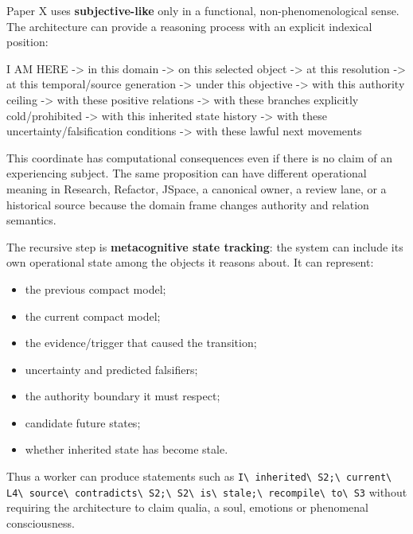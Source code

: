 \documentclass[
  10pt,
  letterpaper,
]{article}
\newenvironment{Shaded}{}{}
\newcommand{\NormalTok}[1]{#1}
\providecommand{\tightlist}{%
  \setlength{\itemsep}{0pt}\setlength{\parskip}{0pt}}
\begin{document}
Paper X uses \textbf{subjective-like} only in a functional,
non-phenomenological sense. The architecture can provide a reasoning
process with an explicit indexical position:

\begin{Shaded}
\begin{Highlighting}[]
\NormalTok{I AM HERE}
\NormalTok{ {-}\textgreater{} in this domain}
\NormalTok{ {-}\textgreater{} on this selected object}
\NormalTok{ {-}\textgreater{} at this resolution}
\NormalTok{ {-}\textgreater{} at this temporal/source generation}
\NormalTok{ {-}\textgreater{} under this objective}
\NormalTok{ {-}\textgreater{} with this authority ceiling}
\NormalTok{ {-}\textgreater{} with these positive relations}
\NormalTok{ {-}\textgreater{} with these branches explicitly cold/prohibited}
\NormalTok{ {-}\textgreater{} with this inherited state history}
\NormalTok{ {-}\textgreater{} with these uncertainty/falsification conditions}
\NormalTok{ {-}\textgreater{} with these lawful next movements}
\end{Highlighting}
\end{Shaded}

This coordinate has computational consequences even if there is no claim
of an experiencing subject. The same proposition can have different
operational meaning in Research, Refactor, JSpace, a canonical owner, a
review lane, or a historical source because the domain frame changes
authority and relation semantics.

The recursive step is \textbf{metacognitive state tracking}: the system
can include its own operational state among the objects it reasons
about. It can represent:

\begin{itemize}
\tightlist
\item
  the previous compact model;
\item
  the current compact model;
\item
  the evidence/trigger that caused the transition;
\item
  uncertainty and predicted falsifiers;
\item
  the authority boundary it must respect;
\item
  candidate future states;
\item
  whether inherited state has become stale.
\end{itemize}

Thus a worker can produce statements such as
\nolinkurl{I\ inherited\ S2;\ current\ L4\ source\ contradicts\ S2;\ S2\ is\ stale;\ recompile\ to\ S3}
without requiring the architecture to claim qualia, a soul, emotions or
phenomenal consciousness.
\end{document}
